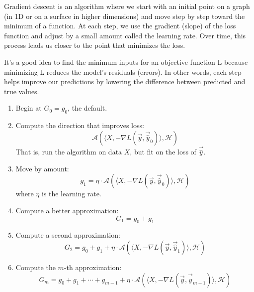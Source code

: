 \documentclass[12pt]{article}
\begin{document}
\begin{enumerate}

Gradient descent is an algorithm where we start with an initial point on a graph (in 1D or on a surface in higher dimensions) and move step by step toward the minimum of a function. At each step, we use the gradient (slope) of the loss function and adjust by a small amount called the learning rate. Over time, this process leads us closer to the point that minimizes the loss.

It’s a good idea to find the minimum inputs for an objective function L because minimizing L reduces the model’s residuals (errors). In other words, each step helps improve our predictions by lowering the difference between predicted and true values.


\begin{enumerate}
    \item Begin at \( G_0 = g_0 \), the default.
    
    \item Compute the direction that improves loss:
    \[
    \mathcal{A}(\langle X, -\nabla L(\vec{y}, \vec{\hat{y}}_0) \rangle, \mathcal{H})
    \]
    That is, run the algorithm on data \( X \), but fit on the loss of \( \vec{\hat{y}} \).
    
    \item Move by amount:
    \[
    g_1 = \eta \cdot \mathcal{A}(\langle X, -\nabla L(\vec{y}, \vec{\hat{y}}_0) \rangle, \mathcal{H})
    \]
    where \( \eta \) is the learning rate.
    
    \item Compute a better approximation:
    \[
    G_1 = g_0 + g_1
    \]
    
    \item Compute a second approximation:
    \[
    G_2 = g_0 + g_1 + \eta \cdot \mathcal{A}(\langle X, -\nabla L(\vec{y}, \vec{\hat{y}}_1) \rangle, \mathcal{H})
    \]
    
    \item Compute the \( m \)-th approximation:
    \[
    G_m = g_0 + g_1 + \cdots + g_{m-1} + \eta \cdot \mathcal{A}(\langle X, -\nabla L(\vec{y}, \vec{\hat{y}}_{m-1}) \rangle, \mathcal{H})
    \]
    

\end{enumerate}
\end{enumerate}
\end{document}
